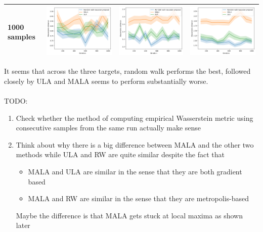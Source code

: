 \documentclass{article}
\theoremstyle{definition}
\newcommand{\1}{\mathbbm{1}}
\begin{document}
{\begin{tabular}{|l|l|l|l|}
	\hline
	1000 samples & \includegraphics[width=.25\linewidth,valign=m]{Different targets/t12.png} & \includegraphics[width=.25\linewidth,valign=m]{Different targets/t22.png} & \includegraphics[width=.25\linewidth,valign=m]{Different targets/t32.png}\\
	\hline
\end{tabular}
}
\newpage
It seems that across the three targets, random walk performs the best, followed closely by ULA and MALA seems to perform substantially worse.
\\\\

TODO: 
\begin{enumerate}
	\item Check whether the method of computing empirical Wasserstein metric using consecutive samples from the same run actually make sense
	
	\item Think about why there is a big difference between MALA and the other two methods while ULA and RW are quite similar despite the fact that 
	
	\begin{itemize}
		\item MALA and ULA are similar in the sense that they are both gradient based
		
		\item MALA and RW are similar in the sense that they are metropolis-based
	\end{itemize}
Maybe the difference is that MALA gets stuck at local maxima as shown later

\end{enumerate}
\newpage
\end{document}
